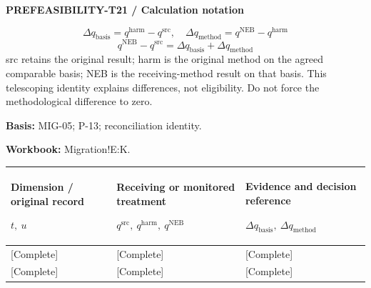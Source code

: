 \Needspace{112mm}
\par\begingroup\sffamily\fontsize{8}{10}\selectfont\color{NEBGreen}\setlength{\parskip}{2pt}\setlength{\abovedisplayskip}{4pt}\setlength{\belowdisplayskip}{4pt}\setlength{\abovedisplayshortskip}{2pt}\setlength{\belowdisplayshortskip}{3pt}
\textbf{PREFEASIBILITY-T21 / Calculation notation}\par
{\fontsize{9}{11}\selectfont\[ \Delta q_{\mathrm{basis}}=q^{\mathrm{harm}}-q^{\mathrm{src}},\quad \Delta q_{\mathrm{method}}=q^{\mathrm{NEB}}-q^{\mathrm{harm}} \]}
{\fontsize{9}{11}\selectfont\[ q^{\mathrm{NEB}}-q^{\mathrm{src}}=\Delta q_{\mathrm{basis}}+\Delta q_{\mathrm{method}} \]}
src retains the original result; harm is the original method on the agreed comparable basis; NEB is the receiving-method result on that basis. This telescoping identity explains differences, not eligibility. Do not force the methodological difference to zero.\par
\textbf{Basis:} MIG-05; P-13; reconciliation identity.\par
\textbf{Workbook:} Migration!E:K.\par\endgroup
{\sffamily\fontsize{8.3}{10.3}\selectfont\begin{longtable}{@{}P{54.83mm} P{54.83mm} P{54.83mm}@{}}
\toprule
\textbf{Dimension / original record}\par {\normalfont\fontsize{8.2}{10}\selectfont $t,\ u$} & \textbf{Receiving or monitored treatment}\par {\normalfont\fontsize{8.2}{10}\selectfont $q^{\mathrm{src}},\ q^{\mathrm{harm}},\ q^{\mathrm{NEB}}$} & \textbf{Evidence and decision reference}\par {\normalfont\fontsize{8.2}{10}\selectfont $\Delta q_{\mathrm{basis}},\ \Delta q_{\mathrm{method}}$}\\\midrule\endhead
\rule{0pt}{8mm}[Complete] & [Complete] & [Complete]\\\hline
\rule{0pt}{8mm}[Complete] & [Complete] & [Complete]\\\hline
\end{longtable}}

